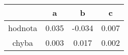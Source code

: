 \begin{tabular}{cccc}                               \toprule
            &   a       &   b       &   c       \\  \midrule
hodnota     &   0.035   &   -0.034  &   0.007   \\
chyba       &   0.003   &   0.017   &   0.002   \\  \bottomrule
\end{tabular}